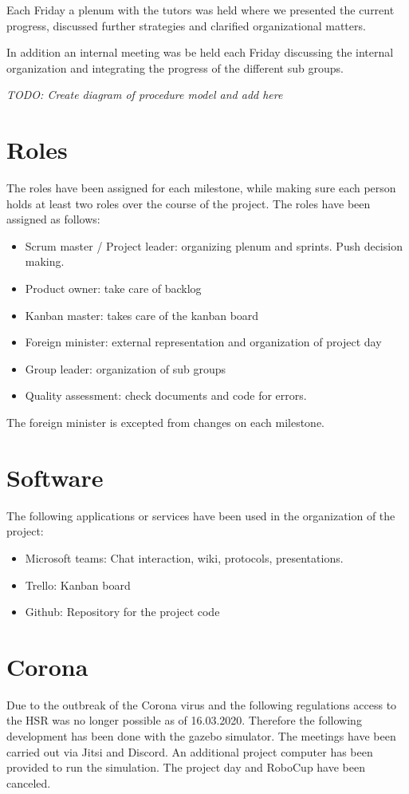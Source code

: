 \documentclass[main.tex]{subfiles}
\begin{document}
	Each Friday a plenum with the tutors was held where we presented the current progress, discussed further strategies and clarified organizational matters.
	
	In addition an internal meeting was be held each Friday discussing the internal organization and integrating the progress of the different sub groups.
	
	\textit{TODO: Create diagram of procedure model and add here}

	\section{Roles}
	The roles have been assigned for each milestone, while making sure each person holds at least two roles over the course of the project. The roles have been assigned as follows:
	\begin{itemize}
		\item Scrum master / Project leader: organizing plenum and sprints. Push decision making.
		\item Product owner: take care of backlog
		\item Kanban master: takes care of the kanban board
		\item Foreign minister: external representation and organization of project day
		\item Group leader: organization of sub groups
		\item Quality assessment: check documents and code for errors.
	\end{itemize}

	The foreign minister is excepted from changes on each milestone.
	
	\section{Software}
	The following applications or services have been used in the organization of the project:
	\begin{itemize}
		\item Microsoft teams: Chat interaction, wiki, protocols, presentations.
		\item Trello: Kanban board
		\item Github: Repository for the project code
	\end{itemize}  

	\section{Corona}
	Due to the outbreak of the Corona virus and the following regulations access to the HSR was no longer possible as of 16.03.2020. Therefore the following development has been done with the gazebo simulator.
	The meetings have been carried out via Jitsi and Discord. An additional project computer has been provided to run the simulation.
	The project day and RoboCup have been canceled.
	
\end{document}
